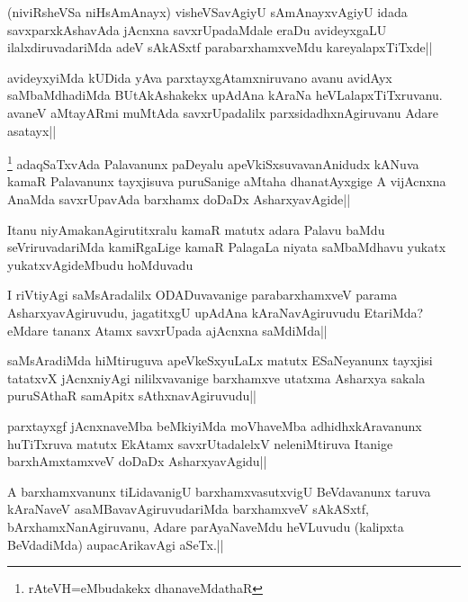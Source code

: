 \begin{artha}%
(niviRsheVSa niHsAmAnayx) visheVSavAgiyU sAmAnayxvAgiyU idada savxparxkAshavAda jAcnxna savxrUpadaMdale eraDu avideyxgaLU ilalxdiruvadariMda adeV sAkASxtf parabarxhamxveMdu kareyalapxTiTxde||
\end{artha}

\begin{artha}
avideyxyiMda kUDida yAva parxtayxgAtamxniruvano avanu avidAyx saMbaMdhadiMda BUtAkAshakekx upAdAna kAraNa heVLalapxTiTxruvanu. avaneV aMtayARmi muMtAda savxrUpadalilx parxsidadhxnAgiruvanu Adare asatayx||
\end{artha}

\begin{artha}
\footnote[1]{rAteVH=eMbudakekx dhanaveMdathaR} adaqSaTxvAda Palavanunx paDeyalu apeVkiSxsuvavanAnidudx kANuva kamaR Palavanunx tayxjisuva puruSanige aMtaha dhanatAyxgige A vijAcnxna AnaMda savxrUpavAda barxhamx doDaDx AsharxyavAgide||
\end{artha}

\begin{artha}
Itanu niyAmakanAgirutitxralu kamaR matutx adara Palavu baMdu seVriruvadariMda kamiRgaLige kamaR PalagaLa niyata saMbaMdhavu yukatx yukatxvAgideMbudu hoMduvadu
\end{artha}

\begin{artha}%
I riVtiyAgi saMsAradalilx ODADuvavanige parabarxhamxveV parama AsharxyavAgiruvudu, jagatitxgU upAdAna kAraNavAgiruvudu EtariMda? eMdare tananx Atamx savxrUpada ajAcnxna saMdiMda||
\end{artha}

\begin{artha}
saMsAradiMda hiMtiruguva apeVkeSxyuLaLx matutx ESaNeyanunx tayxjisi tatatxvX jAcnxniyAgi nililxvavanige barxhamxve utatxma Asharxya sakala puruSAthaR samApitx sAthxnavAgiruvudu||
\end{artha}

\begin{artha}
parxtayxgf jAcnxnaveMba beMkiyiMda moVhaveMba adhidhxkAravanunx huTiTxruva matutx EkAtamx savxrUtadalelxV neleniMtiruva Itanige barxhAmxtamxveV doDaDx AsharxyavAgidu||
\end{artha}

\begin{artha}
A barxhamxvanunx tiLidavanigU barxhamxvasutxvigU BeVdavanunx taruva kAraNaveV asaMBavavAgiruvudariMda barxhamxveV sAkASxtf, bArxhamxNanAgiruvanu, Adare parAyaNaveMdu heVLuvudu (kalipxta BeVdadiMda) aupacArikavAgi aSeTx.||
\end{artha}

